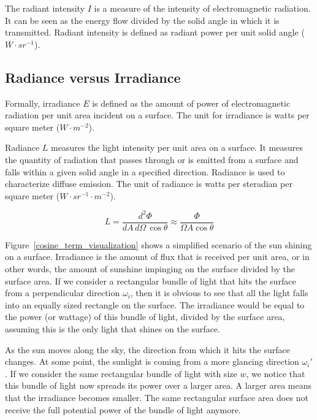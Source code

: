 \documentclass[11pt,a4paper]{report}
\begin{document}
The radiant intensity $I$ is a measure of the intensity of electromagnetic radiation. It can be seen as the energy flow divided by the solid angle in which it is transmitted. Radiant intensity is defined as radiant power per unit solid angle ($W \cdot sr^{-1}$).

\subsection{Radiance versus Irradiance}
\label{radiance_irradiance}

Formally, irradiance $E$ is defined as the amount of power of electromagnetic radiation per unit area incident on a surface. The unit for irradiance is watts per square meter ($W \cdot m^{-2}$). 

Radiance $L$ measures the light intensity per unit area on a surface. It measures the quantity of radiation that passes through or is emitted from a surface and falls within a given solid angle in a specified direction. Radiance is used to characterize diffuse emission. The unit of radiance is watts per steradian per square meter ($W \cdot {sr}^{-1} \cdot m^{-2}$).

\begin{equation}
L = \frac{d^2 \Phi}{dA\, d\Omega\, \cos \theta} \approx \frac{\Phi}{\Omega A \cos \theta}
\end{equation}

Figure~\ref{cosine_term_visualization} shows a simplified scenario of the sun shining on a surface. Irradiance is the amount of flux that is received per unit area, or in other words, the amount of sunshine impinging on the surface divided by the surface area. If we consider a rectangular bundle of light that hits the surface from a perpendicular direction $\omega_i$, then it is obvious to see that all the light falls into an equally sized rectangle on the surface. The irradiance would be equal to the power (or wattage) of this bundle of light, divided by the surface area, assuming this is the only light that shines on the surface.

As the sun moves along the sky, the direction from which it hits the surface changes. At some point, the sunlight is coming from a more glancing direction $\omega_i'$. If we consider the same rectangular bundle of light with size $w$, we notice that this bundle of light now spreads its power over a larger area. A larger area means that the irradiance becomes smaller. The same rectangular surface area does not receive the full potential power of the bundle of light anymore.
\end{document}
